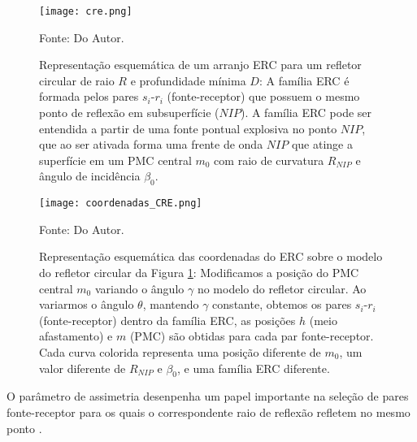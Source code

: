 \begin{figure}[htb]
\caption{Representação esquemática de um arranjo ERC para um refletor circular de raio $R$ e profundidade
mínima $D$: A família ERC é formada pelos pares $s_i$-$r_i$ (fonte-receptor) que possuem o mesmo ponto de
reflexão em subsuperfície ($NIP$). A família ERC pode ser entendida a partir de uma fonte pontual explosiva
no ponto $NIP$, que ao ser ativada forma uma frente de onda $NIP$ que atinge a superfície em um PMC central 
$m_0$ com raio de curvatura $R_{NIP}$ e ângulo de incidência $\beta_0$.}
\begin{center}
\texttt{[image: cre.png]}
\vspace{-0.3cm}
\end{center}
\begin{center}
 Fonte: Do Autor.
\end{center}
\label{fig:4.1}
\end{figure}


\begin{figure}[htb]
\caption{Representação esquemática das coordenadas do ERC sobre o modelo do refletor circular da Figura \ref{fig:4.1}:
Modificamos a posição do PMC central $m_0$ variando o ângulo $\gamma$ no modelo do refletor circular.
Ao variarmos o ângulo $\theta$, mantendo $\gamma$ constante, obtemos os pares $s_i$-$r_i$ (fonte-receptor)
dentro da família
ERC, as posições $h$ (meio afastamento) e $m$ (PMC) são obtidas para cada par fonte-receptor.
Cada curva colorida representa uma posição
diferente de $m_0$, um valor diferente de $R_{NIP}$ e $\beta_0$, e uma família ERC diferente.}
\begin{center}
\texttt{[image: coordenadas\_CRE.png]}
\vspace{-0.3cm}
\end{center}
\begin{center}
 Fonte: Do Autor.
\end{center}
\label{fig:4.2}
\end{figure}





O parâmetro de assimetria desenpenha um papel importante na seleção de pares fonte-receptor para os quais
o correspondente raio de reflexão refletem no mesmo ponto \cite{tygel}.


